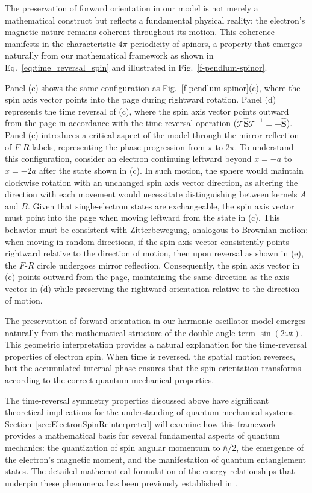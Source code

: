 \documentclass[%
 reprint,
 amsmath,amssymb,
 aps,
]{revtex4-1}
\numberwithin{equation}{section}%
\begin{document}
The preservation of forward orientation in our model is not merely a mathematical construct but reflects a fundamental physical reality: the electron's magnetic nature remains coherent throughout its motion. This coherence manifests in the characteristic $4\pi$ periodicity of spinors, a property that emerges naturally from our mathematical framework as shown in Eq.~\ref{eq:time_reversal_spin} and illustrated in Fig.~\ref{f-pendlum-spinor}.
    
Panel (c) shows the same configuration as Fig.~\ref{f-pendlum-spinor}(c), where the spin axis vector points into the page during rightward rotation. Panel (d) represents the time reversal of (c), where the spin axis vector points outward from the page in accordance with the time-reversal operation ($\mathcal{T}\hat{\boldsymbol{S}}\mathcal{T}^{-1} = -\hat{\boldsymbol{S}}$). Panel (e) introduces a critical aspect of the model through the mirror reflection of $F$-$R$ labels, representing the phase progression from $\pi$ to 2$\pi$. To understand this configuration, consider an electron continuing leftward beyond $x = -a$ to $x = -2a$ after the state shown in (c). In such motion, the sphere would maintain clockwise rotation with an unchanged spin axis vector direction, as altering the direction with each movement would necessitate distinguishing between kernels $A$ and $B$. Given that single-electron states are exchangeable, the spin axis vector must point into the page when moving leftward from the state in (c). This behavior must be consistent with Zitterbewegung, analogous to Brownian motion: when moving in random directions, if the spin axis vector consistently points rightward relative to the direction of motion, then upon reversal as shown in (e), the $F$-$R$ circle undergoes mirror reflection. Consequently, the spin axis vector in (e) points outward from the page, maintaining the same direction as the axis vector in (d) while preserving the rightward orientation relative to the direction of motion.

The preservation of forward orientation in our harmonic oscillator model emerges naturally from the mathematical structure of the double angle term \( \sin(2\omega t) \). This geometric interpretation provides a natural explanation for the time-reversal properties of electron spin. When time is reversed, the spatial motion reverses, but the accumulated internal phase ensures that the spin orientation transforms according to the correct quantum mechanical properties.

The time-reversal symmetry properties discussed above have significant theoretical implications for the understanding of quantum mechanical systems. Section~\ref{sec:ElectronSpinReinterpreted} will examine how this framework provides a mathematical basis for several fundamental aspects of quantum mechanics: the quantization of spin angular momentum to $\hbar/2$, the emergence of the electron's magnetic moment, and the manifestation of quantum entanglement states. The detailed mathematical formulation of the energy relationships that underpin these phenomena has been previously established in \cite{Hanamura2023}.
\end{document}

